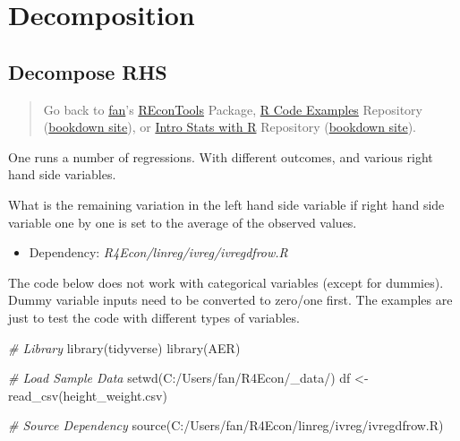 \documentclass[
]{book}
\newenvironment{Shaded}{\begin{snugshade}}{\end{snugshade}}
\newcommand{\CommentTok}[1]{\textcolor[rgb]{0.56,0.35,0.01}{\textit{#1}}}
\newcommand{\FunctionTok}[1]{\textcolor[rgb]{0.00,0.00,0.00}{#1}}
\newcommand{\NormalTok}[1]{#1}
\newcommand{\OtherTok}[1]{\textcolor[rgb]{0.56,0.35,0.01}{#1}}
\newcommand{\StringTok}[1]{\textcolor[rgb]{0.31,0.60,0.02}{#1}}
\providecommand{\tightlist}{%
  \setlength{\itemsep}{0pt}\setlength{\parskip}{0pt}}
\begin{document}
\hypertarget{decomposition}{%
\section{Decomposition}\label{decomposition}}

\hypertarget{decompose-rhs}{%
\subsection{Decompose RHS}\label{decompose-rhs}}

\begin{quote}
Go back to \href{http://fanwangecon.github.io/}{fan}'s \href{https://fanwangecon.github.io/REconTools/}{REconTools} Package, \href{https://fanwangecon.github.io/R4Econ/}{R Code Examples} Repository (\href{https://fanwangecon.github.io/R4Econ/bookdown}{bookdown site}), or \href{https://fanwangecon.github.io/Stat4Econ/}{Intro Stats with R} Repository (\href{https://fanwangecon.github.io/Stat4Econ/bookdown}{bookdown site}).
\end{quote}

One runs a number of regressions. With different outcomes, and various right hand side variables.

What is the remaining variation in the left hand side variable if right hand side variable one by one is set to the average of the observed values.

\begin{itemize}
\tightlist
\item
  Dependency: \emph{R4Econ/linreg/ivreg/ivregdfrow.R}
\end{itemize}

The code below does not work with categorical variables (except for dummies). Dummy variable inputs need to be converted to zero/one first. The examples are just to test the code with different types of variables.

\begin{Shaded}
\begin{Highlighting}[]
\CommentTok{\# Library}
\FunctionTok{library}\NormalTok{(tidyverse)}
\FunctionTok{library}\NormalTok{(AER)}

\CommentTok{\# Load Sample Data}
\FunctionTok{setwd}\NormalTok{(}\StringTok{\textquotesingle{}C:/Users/fan/R4Econ/\_data/\textquotesingle{}}\NormalTok{)}
\NormalTok{df }\OtherTok{\textless{}{-}} \FunctionTok{read\_csv}\NormalTok{(}\StringTok{\textquotesingle{}height\_weight.csv\textquotesingle{}}\NormalTok{)}

\CommentTok{\# Source Dependency}
\FunctionTok{source}\NormalTok{(}\StringTok{\textquotesingle{}C:/Users/fan/R4Econ/linreg/ivreg/ivregdfrow.R\textquotesingle{}}\NormalTok{)}
\end{Highlighting}
\end{Shaded}
\end{document}
